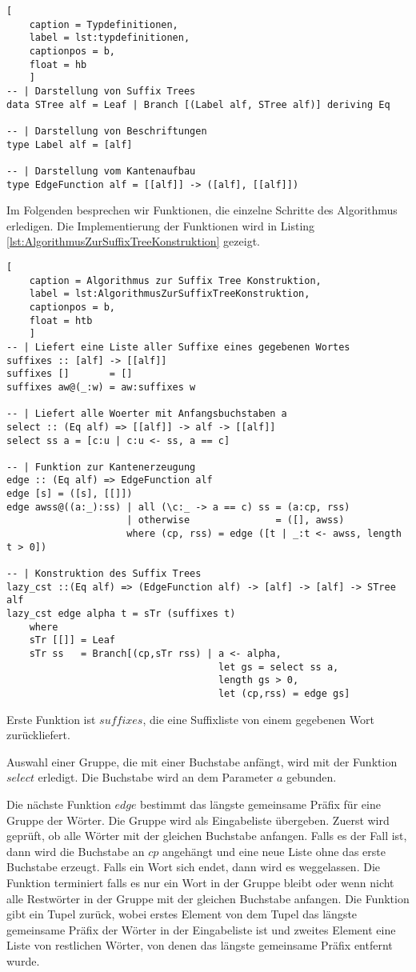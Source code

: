 \documentclass[12pt]{report}
\begin{document}
\begin{lstlisting}[
    caption = Typdefinitionen,
    label = lst:typdefinitionen,
    captionpos = b,
    float = hb
    ]
-- | Darstellung von Suffix Trees
data STree alf = Leaf | Branch [(Label alf, STree alf)] deriving Eq

-- | Darstellung von Beschriftungen
type Label alf = [alf]

-- | Darstellung vom Kantenaufbau
type EdgeFunction alf = [[alf]] -> ([alf], [[alf]])
\end{lstlisting}

Im Folgenden besprechen wir Funktionen, die einzelne Schritte des Algorithmus erledigen. Die Implementierung der Funktionen wird in Listing \ref{lst:AlgorithmusZurSuffixTreeKonstruktion} gezeigt.

\begin{lstlisting}[
    caption = Algorithmus zur Suffix Tree Konstruktion,
    label = lst:AlgorithmusZurSuffixTreeKonstruktion,
    captionpos = b,
    float = htb
    ]
-- | Liefert eine Liste aller Suffixe eines gegebenen Wortes
suffixes :: [alf] -> [[alf]]
suffixes []       = []
suffixes aw@(_:w) = aw:suffixes w

-- | Liefert alle Woerter mit Anfangsbuchstaben a
select :: (Eq alf) => [[alf]] -> alf -> [[alf]]
select ss a = [c:u | c:u <- ss, a == c]

-- | Funktion zur Kantenerzeugung
edge :: (Eq alf) => EdgeFunction alf
edge [s] = ([s], [[]])
edge awss@((a:_):ss) | all (\c:_ -> a == c) ss = (a:cp, rss)
                     | otherwise               = ([], awss)
                     where (cp, rss) = edge ([t | _:t <- awss, length t > 0])

-- | Konstruktion des Suffix Trees
lazy_cst ::(Eq alf) => (EdgeFunction alf) -> [alf] -> [alf] -> STree alf
lazy_cst edge alpha t = sTr (suffixes t)
    where
    sTr [[]] = Leaf
    sTr ss   = Branch[(cp,sTr rss) | a <- alpha,
                                     let gs = select ss a,
                                     length gs > 0,
                                     let (cp,rss) = edge gs]
\end{lstlisting}

Erste Funktion ist $suffixes$, die eine Suffixliste von einem gegebenen Wort zurückliefert.

Auswahl einer Gruppe, die mit einer Buchstabe anfängt, wird mit der Funktion $select$ erledigt. Die Buchstabe wird an dem Parameter $a$ gebunden.

Die nächste Funktion $edge$ bestimmt das längste gemeinsame Präfix für eine Gruppe der Wörter. Die Gruppe wird als Eingabeliste übergeben. Zuerst wird geprüft, ob alle Wörter mit der gleichen Buchstabe anfangen. Falls es der Fall ist, dann wird die Buchstabe an $cp$ angehängt und eine neue Liste ohne das erste Buchstabe erzeugt. Falls ein Wort sich endet, dann wird es weggelassen. Die Funktion terminiert falls es nur ein Wort in der Gruppe bleibt oder wenn nicht alle Restwörter in der Gruppe mit der gleichen Buchstabe anfangen. Die Funktion gibt ein Tupel zurück, wobei erstes Element von dem Tupel das längste gemeinsame Präfix der Wörter in der Eingabeliste ist und zweites Element eine Liste von restlichen Wörter, von denen das längste gemeinsame Präfix entfernt wurde.
\end{document}
